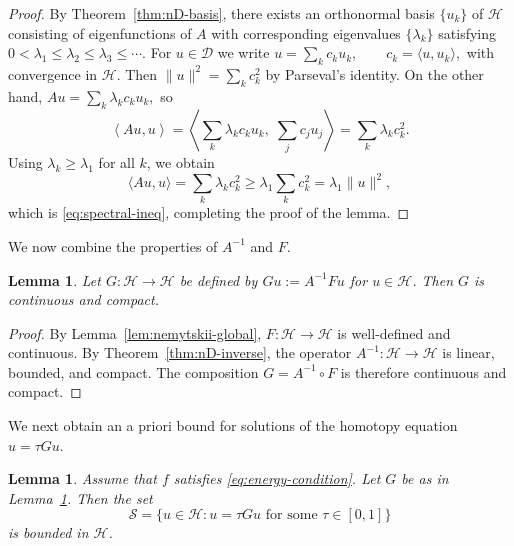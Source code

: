 \documentclass{article}
\newtheorem{lemma}[theorem]{Lemma}
\numberwithin{equation}{section}
\numberwithin{theorem}{section}
\begin{document}
\begin{proof}
By Theorem~\ref{thm:nD-basis}, there exists an orthonormal basis $\{u_k\}$ of $\mathscr{H}$ consisting of eigenfunctions of $A$ with corresponding eigenvalues $\{\lambda_k\}$ satisfying
$0 < \lambda_1 \le \lambda_2 \le \lambda_3 \le \cdots.$
For $u\in \mathscr{D}$ we write
$u = \sum_{k} c_k u_k, \qquad c_k = \langle u,u_k\rangle,$
with convergence in $\mathscr{H}$. Then
$\|u\|^2 = \displaystyle\sum_{k} c_k^2$
by Parseval's identity. On the other hand,
$Au = \displaystyle\sum_{k} \lambda_k c_k u_k,$ so 
\[\left\langle Au,u\right\rangle
= \left\langle \displaystyle\sum_{k} \lambda_k c_k u_k,\; \sum_{j} c_j u_j \right\rangle
= \displaystyle\sum_{k} \lambda_k c_k^2.\]
Using $\lambda_k \ge \lambda_1$ for all $k$, we obtain
\[
\langle Au,u\rangle = \sum_{k} \lambda_k c_k^2
\ge \lambda_1 \sum_{k} c_k^2
= \lambda_1 \|u\|^2,
\]
which is \eqref{eq:spectral-ineq}, completing the proof of the lemma.
\end{proof}
We now combine the properties of $A^{-1}$ and $F$.
\begin{lemma}\label{lem:compact-G}
Let $G\colon \mathscr{H}\to \mathscr{H}$ be defined by $Gu := A^{-1} Fu$ for $u\in \mathscr{H}$. Then $G$ is continuous and compact.
\end{lemma}

\begin{proof}
By Lemma~\ref{lem:nemytskii-global}, $F\colon \mathscr{H}\to \mathscr{H}$ is well-defined and continuous. By Theorem~\ref{thm:nD-inverse}, the operator $A^{-1}\colon \mathscr{H}\to \mathscr{H}$ is linear, bounded, and compact. The composition $G = A^{-1}\circ F$ is therefore continuous and compact.
\end{proof}
We next obtain an a priori bound for solutions of the homotopy equation $u = \tau Gu$.
\begin{lemma}\label{lem:apriori}
Assume that $f$ satisfies \eqref{eq:energy-condition}. Let $G$ be as in Lemma~\ref{lem:compact-G}. Then the set
\[\mathcal{S} = \{u\in \mathscr{H} \colon u = \tau Gu \text{ for some } \tau\in[0,1]\}\]
is bounded in $\mathscr{H}$.
\end{lemma}
\end{document}
